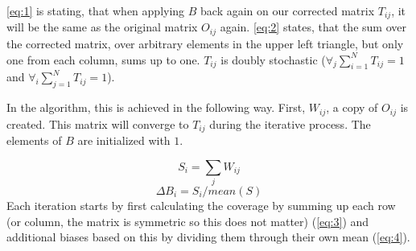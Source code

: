
\eqref{eq:1} is stating, that when applying $B$ back again on our corrected
matrix $T_{ij}$, it will be the same as the original matrix $O_{ij}$ again.
\eqref{eq:2} states, that the sum over the corrected matrix, over arbitrary
elements in the upper left triangle, but only one from each column, sums up to
one. $T_{ij}$ is doubly stochastic ($\forall_j\sum^N_{i=1}T_{ij} = 1$ and
$\forall_i\sum^N_{j=1}T_{ij} = 1$).


In the algorithm, this is achieved in the following way. First, $W_{ij}$, a
copy of $O_{ij}$ is created. This matrix will converge to $T_{ij}$ during the
iterative process. The elements of $B$ are initialized with $1$.


\begin{equation}\label{eq:3}
    S_i = \sum_j W_{ij}
\end{equation}
\begin{equation}\label{eq:4}
    \Delta B_i = S_i / mean(S)
\end{equation}
Each iteration starts by first calculating the coverage by summing up each row
(or column, the matrix is symmetric so this does not matter) (\eqref{eq:3}) and
additional biases based on this by dividing them through their own mean
(\eqref{eq:4}).

